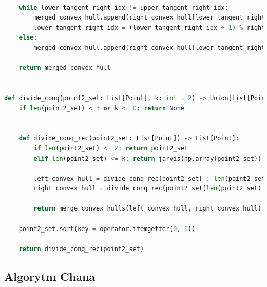 \documentclass[11pt]{article}
\theoremstyle{remark} \newtheorem{definition}{def.}
\theoremstyle{definition} \newtheorem{twierdzenie}{tw.}
\begin{document}
\begin{lstlisting}[language=Python]
        
    while lower_tangent_right_idx != upper_tangent_right_idx:
        merged_convex_hull.append(right_convex_hull[lower_tangent_right_idx])
        lower_tangent_right_idx = (lower_tangent_right_idx + 1) % right_ch_size    
    else:
        merged_convex_hull.append(right_convex_hull[lower_tangent_right_idx])
    
    return merged_convex_hull 


def divide_conq(point2_set: List[Point], k: int = 2) -> Union[List[Point], None]:
    if len(point2_set) < 3 or k <= 0: return None     

    
    def divide_conq_rec(point2_set: List[Point]) -> List[Point]:
        if len(point2_set) <= 2: return point2_set
        elif len(point2_set) <= k: return jarvis(np.array(point2_set))
    
        left_convex_hull = divide_conq_rec(point2_set[ : len(point2_set) // 2])
        right_convex_hull = divide_conq_rec(point2_set[len(point2_set) // 2 : ])
    
        return merge_convex_hulls(left_convex_hull, right_convex_hull)
    
    point2_set.sort(key = operator.itemgetter(0, 1))    

    return divide_conq_rec(point2_set)
\end{lstlisting}

\subsection{Algorytm Chana}
\end{document}
